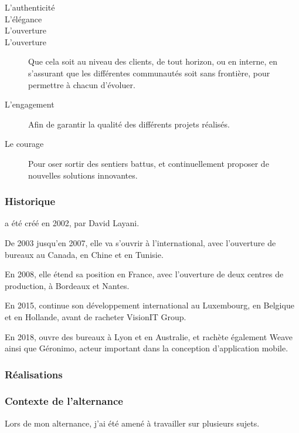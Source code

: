 \begin{description}
	\item[L'authenticité]
	\item[L'élégance]
	\item[L'ouverture]
	\item[L'ouverture] Que cela soit au niveau des clients, de tout horizon, ou en interne, en s'assurant que les différentes communautés soit sans frontière, pour permettre à chacun d'évoluer.
	\item[L'engagement] Afin de garantir la qualité des différents projets réalisés.
	\item[Le courage] Pour oser sortir des sentiers battus, et continuellement proposer de nouvelles solutions innovantes.
\end{description}

\subsubsection*{Historique} 

\xmakefirstuc{\onepoint{}} a été créé en 2002, par David Layani.

De 2003 jusqu'en 2007, elle va s'ouvrir à l'international, avec l'ouverture de bureaux au Canada, en Chine et en Tunisie. 

En 2008, elle étend sa position en France, avec l'ouverture de deux centres de production, à Bordeaux et Nantes.

En 2015, \onepoint{} continue son développement international au Luxembourg, en Belgique et en Hollande, avant de racheter VisionIT Group.

En 2018, \onepoint{} ouvre des bureaux à Lyon et en Australie, et rachète également Weave ainsi que Géronimo, acteur important dans la conception d'application mobile.

\subsubsection*{Réalisations}


\subsubsection*{Contexte de l'alternance}

Lors de mon alternance, j'ai été amené à travailler sur plusieurs sujets.

